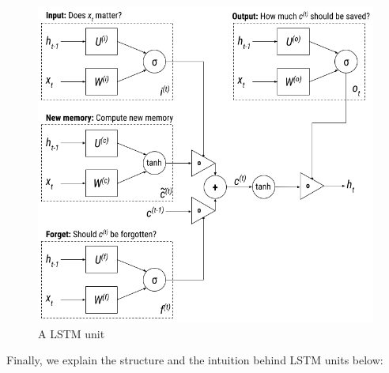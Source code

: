 \begin{figure}[!htb]
    \centering
    \includegraphics[scale=0.55]{Figures/lstm-unit.png}
    \caption{A LSTM unit}
    \label{fig:lstmunit}
\end{figure}

Finally, we explain the structure and the intuition behind LSTM units below:

